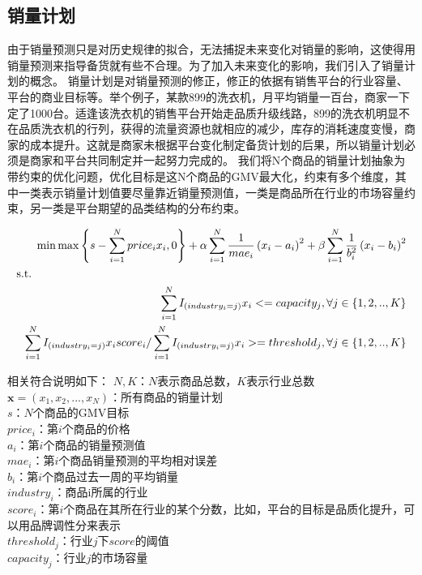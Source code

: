 \subsection{销量计划}
由于销量预测只是对历史规律的拟合，无法捕捉未来变化对销量的影响，这使得用销量预测来指导备货就有些不合理。为了加入未来变化的影响，我们引入了销量计划的概念。
销量计划是对销量预测的修正，修正的依据有销售平台的行业容量、平台的商业目标等。举个例子，某款899的洗衣机，月平均销量一百台，商家一下定了1000台。适逢该洗衣机的销售平台开始走品质升级线路，899的洗衣机明显不在品质洗衣机的行列，获得的流量资源也就相应的减少，库存的消耗速度变慢，商家的成本提升。这就是商家未根据平台变化制定备货计划的后果，所以销量计划必须是商家和平台共同制定并一起努力完成的。
我们将N个商品的销量计划抽象为带约束的优化问题，优化目标是这N个商品的GMV最大化，约束有多个维度，其中一类表示销量计划值要尽量靠近销量预测值，一类是商品所在行业的市场容量约束，另一类是平台期望的品类结构的分布约束。

\begin{align}
\min \max\left \{ s-\sum_{i=1}^{N}price_{i}x_{i},0 \right \}  +\alpha \sum_{i=1}^{N}\frac{1}{mae_{i}}\left ( x_{i}-a_{i} \right ) ^{2}  + \beta \sum_{i=1}^{N}\frac{1}{b_{i}^{2}}\left ( x_{i}-b_{i} \right ) ^{2} \\
\leftline{s.t.} \\\sum_{i=1}^{N}I_{\left ( industry_{i}=j \right )} x_{i} <= capacity_{j}, \forall j \in \left \{ 1,2,..,K \right \} \\
\sum_{i=1}^{N}I_{\left ( industry_{i}=j \right )} x_{i} score_{i}/\sum_{i=1}^{N}I_{\left ( industry_{i}=j \right )} x_{i}>= threshold_{j}, \forall j \in \left \{ 1,2,..,K \right \}
\end{align}

相关符合说明如下：
$N,K$：$N$表示商品总数，$K$表示行业总数\\
$\mathbf{x} = \left (x_{1},x_{2},...,x_{N} \right )$：所有商品的销量计划\\
$s$：$N$个商品的GMV目标\\
$price_{i}$：第$i$个商品的价格\\
$a_{i}$：第$i$个商品的销量预测值\\
$mae_{i}$：第$i$个商品销量预测的平均相对误差\\
$b_{i}$：第$i$个商品过去一周的平均销量\\
$industry_{i}$：商品i所属的行业\\
$score_{i}$：第$i$个商品在其所在行业的某个分数，比如，平台的目标是品质化提升，可以用品牌调性分来表示\\
$threshold_{j}$：行业$j$下$score$的阈值\\
$capacity_{j}$：行业$j$的市场容量\\

